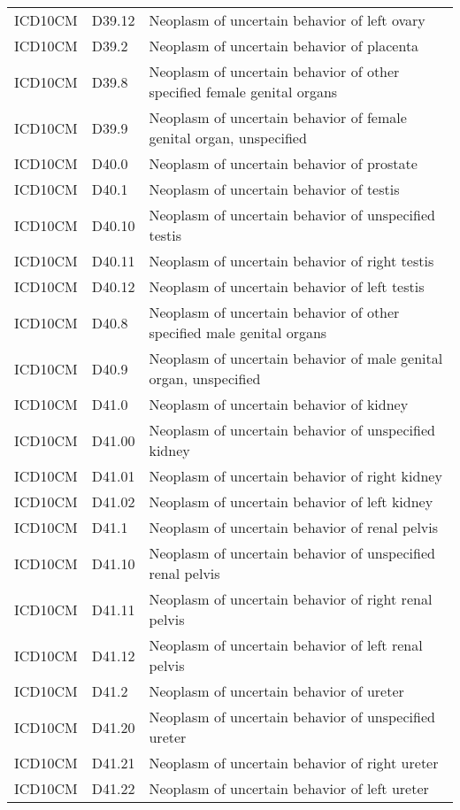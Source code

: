 \begin{longtable}{p{}p{}p{}}
  ICD10CM & D39.12 & Neoplasm of uncertain behavior of left ovary \\ 
  ICD10CM & D39.2 & Neoplasm of uncertain behavior of placenta \\ 
  ICD10CM & D39.8 & Neoplasm of uncertain behavior of other specified female genital organs \\ 
  ICD10CM & D39.9 & Neoplasm of uncertain behavior of female genital organ, unspecified \\ 
  ICD10CM & D40.0 & Neoplasm of uncertain behavior of prostate \\ 
  ICD10CM & D40.1 & Neoplasm of uncertain behavior of testis \\ 
  ICD10CM & D40.10 & Neoplasm of uncertain behavior of unspecified testis \\ 
  ICD10CM & D40.11 & Neoplasm of uncertain behavior of right testis \\ 
  ICD10CM & D40.12 & Neoplasm of uncertain behavior of left testis \\ 
  ICD10CM & D40.8 & Neoplasm of uncertain behavior of other specified male genital organs \\ 
  ICD10CM & D40.9 & Neoplasm of uncertain behavior of male genital organ, unspecified \\ 
  ICD10CM & D41.0 & Neoplasm of uncertain behavior of kidney \\ 
  ICD10CM & D41.00 & Neoplasm of uncertain behavior of unspecified kidney \\ 
  ICD10CM & D41.01 & Neoplasm of uncertain behavior of right kidney \\ 
  ICD10CM & D41.02 & Neoplasm of uncertain behavior of left kidney \\ 
  ICD10CM & D41.1 & Neoplasm of uncertain behavior of renal pelvis \\ 
  ICD10CM & D41.10 & Neoplasm of uncertain behavior of unspecified renal pelvis \\ 
  ICD10CM & D41.11 & Neoplasm of uncertain behavior of right renal pelvis \\ 
  ICD10CM & D41.12 & Neoplasm of uncertain behavior of left renal pelvis \\ 
  ICD10CM & D41.2 & Neoplasm of uncertain behavior of ureter \\ 
  ICD10CM & D41.20 & Neoplasm of uncertain behavior of unspecified ureter \\ 
  ICD10CM & D41.21 & Neoplasm of uncertain behavior of right ureter \\ 
  ICD10CM & D41.22 & Neoplasm of uncertain behavior of left ureter \\ 

\end{longtable}
